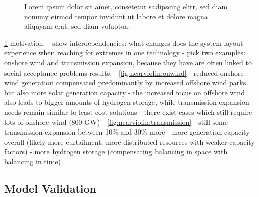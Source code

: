 \begin{figure}
    \noindent{}
    \caption{Lorem ipsum dolor sit amet, consetetur sadipscing elitr, sed diam nonumy eirmod tempor invidunt ut labore et dolore magna aliquyam erat, sed diam voluptua.}
    \label{fig:nearviolin}
\end{figure}

\cref{fig:nearviolin}
motivation:
- show interdependencies: what changes does the system layout experience when reaching for extremes in one technology
- pick two examples: onshore wind and transmission expansion, because they have are often linked to social acceptance problems
results:
- \cref{fig:nearviolin:onwind}
  - reduced onshore wind generation compensated predominantly by increased offshore wind parks but also more solar generation capacity
  - the increased focus on offshore wind also leads to bigger amounts of hydrogen storage, while transmission expansion needs remain similar to least-cost solutions
  - there exist cases which still require lots of onshore wind (800 GW)
- \cref{fig:nearviolin:transmission}
  - still some transmission expansion between 10\% and 30\% more
  - more generation capacity overall (likely more curtailment, more distributed resources with weaker capacity factors)
  - more hydrogen storage (compensating balancing in space with balancing in time)

\subsection{Model Validation}
\label{sec:validation}

